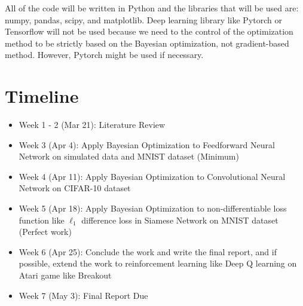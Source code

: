 \documentclass{article}
\begin{document}
All of the code will be written in Python and the libraries that will be used are: numpy, pandas, scipy, and matplotlib. Deep learning library like Pytorch or Tensorflow will not be used because we need to the control of the optimization method to be strictly 
based on the Bayesian optimization, not gradient-based method. However, Pytorch might be used if necessary.
\section{Timeline}
\begin{itemize}
\item Week 1 - 2 (Mar 21): Literature Review
\item Week 3 (Apr 4): Apply Bayesian Optimization to Feedforward Neural Network on simulated data and MNIST dataset (Minimum)
\item Week 4 (Apr 11): Apply Bayesian Optimization to Convolutional Neural Network on CIFAR-10 dataset
\item Week 5 (Apr 18): Apply Bayesian Optimization to non-differentiable loss function like $\ell_1$ difference loss in Siamese Network on MNIST dataset (Perfect work)
\item Week 6 (Apr 25): Conclude the work and write the final report, and if possible, extend the work to reinforcement learning like Deep Q learning on Atari game like Breakout
\item Week 7 (May 3): Final Report Due
\end{itemize}

\end{document}
